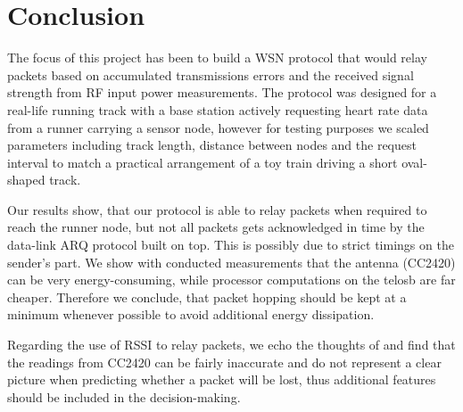 \section{Conclusion}\label{ch:conclusion}

The focus of this project has been to build a WSN protocol that would relay packets based on accumulated transmissions errors and the received signal strength from RF input power measurements. The protocol was designed for a real-life running track with a base station actively requesting heart rate data from a runner carrying a sensor node, however for testing purposes we scaled parameters including track length, distance between nodes and the request interval to match a practical arrangement of a toy train driving a short oval-shaped track. 

Our results show, that our protocol is able to relay packets when required to reach the runner node, but not all packets gets acknowledged in time by the data-link ARQ protocol built on top. This is possibly due to strict timings on the sender's part. We show with conducted measurements that the antenna (CC2420) can be very energy-consuming, while processor computations on the telosb are far cheaper. Therefore we conclude, that packet hopping should be kept at a minimum whenever possible to avoid additional energy dissipation.

Regarding the use of RSSI to relay packets, we echo the thoughts of \cite{Heurtefeux2012} and find that the readings from CC2420 can be fairly inaccurate and do not represent a clear picture when predicting whether a packet will be lost, thus additional features should be included in the decision-making.